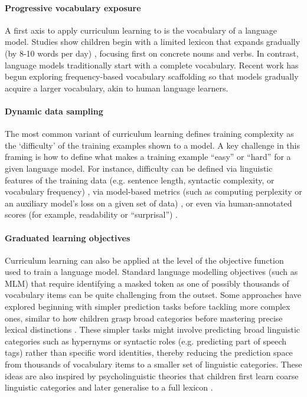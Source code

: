 \paragraph{Progressive vocabulary exposure} A first axis to apply curriculum learning to is the vocabulary of a language model. Studies show children begin with a limited lexicon that expands gradually (by 8-10 words per day) \citep{fenson1994variability, bergelson2015early, weizman2001lexical}, focusing first on concrete nouns and verbs. In contrast, language models traditionally start with a complete vocabulary. Recent work has begun exploring frequency-based vocabulary scaffolding \citep{soviany2022curriculum} so that models gradually acquire a larger vocabulary, akin to human language learners. 

\paragraph{Dynamic data sampling} The most common variant of curriculum learning defines training complexity as the `difficulty' of the training examples shown to a model. A key challenge in this framing is how to define what makes a training example “easy” or “hard” for a given language model. For instance, difficulty can be defined via linguistic features of the training data (e.g. sentence length, syntactic complexity, or vocabulary frequency) \citep{campos2021curriculum, kocmi2017curriculum, liu2018curriculum}, via model-based metrics (such as computing perplexity or an auxiliary model's loss on a given set of data) \citep{sachan2016easy, lalor2020dynamic}, or even via human-annotated scores (for example, readability or “surprisal”) \citep{soviany2022curriculum}. 

\paragraph{Graduated learning objectives} Curriculum learning can also be applied at the level of the objective function used to train a language model. Standard language modelling objectives (such as MLM) that require identifying a masked token as one of possibly thousands of vocabulary items can be quite challenging from the outset. Some approaches have explored beginning with simpler prediction tasks before tackling more complex ones, similar to how children grasp broad categories before mastering precise lexical distinctions \citep{markman1990constraints}. These simpler tasks might involve predicting broad linguistic categories such as hypernyms \citet{bai2022better} or syntactic roles (e.g. predicting part of speech tags) \citet{wang2023language, cui2022lert} rather than specific word identities, thereby reducing the prediction space from thousands of vocabulary items to a smaller set of linguistic categories. These ideas are also inspired by psycholinguistic theories that children first learn coarse linguistic categories and later generalise to a full lexicon \citep{alishahi2010computational, gleitman1990structural}.

